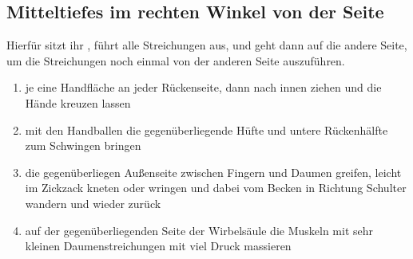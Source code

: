 \iftoggle{long}{
  \pagebreak
}{}
\subsection{Mitteltiefes im rechten Winkel von der Seite}
Hierfür sitzt ihr , führt alle Streichungen aus, und geht dann auf die andere Seite, um die Streichungen noch einmal von der anderen Seite auszuführen.

\begin{oframed}
  \begin{enumerate}
    \item {} je eine Handfläche an jeder Rückenseite, dann nach innen ziehen und die Hände kreuzen lassen
    \iftoggle{long}{
      \item \fett{Rücken öffnen 1:} Legt eure beiden Hände in "`Bet-Haltung"' mit den Handkanten quer zur Wirbelsäule auf die Mitte des Rückens. Geht dann zuerst mit euren Handkanten nach außen, sodass eure Handflächen nach unten zeigen. Zieht sehr langsam mit Kraft nach außen oben bis zum Nacken und unten bis zum Kreuzbein. Haltet diese Position ein paar Sekunden. Achtet darauf, dass ihr keinen Druck direkt auf die Wirbelsäule ausübt.
      \item \fett{Rücken öffnen 2:} Legt eure Unterarme quer zur Wirbelsäule auf die Mitte des Rückens. Die Bewegung ist dann dieselbe wie beim vorherigen Schritt.
    }{}
    \item {} mit den Handballen die gegenüberliegende Hüfte und untere Rückenhälfte zum Schwingen bringen
    \item {} die gegenüberliegen Außenseite zwischen Fingern und Daumen greifen, leicht im Zickzack kneten oder wringen und dabei vom Becken in Richtung Schulter wandern und wieder zurück
    \item {} auf der gegenüberliegenden Seite der Wirbelsäule die Muskeln mit sehr kleinen Daumenstreichungen mit viel Druck massieren
    \iftoggle{long}{
      \item \fett{Endlos-Streichungen auf dem Rückenstrecker mit Fingerknöcheln:} Formt Tigerkrallen mit euren Händen. Streicht dann mit dem zweiten Knöchel der Finger beider Hände den Rückenstrecker der \fett{gegenüberliegenden Rückenhälfte} von der Hüfte bis zum Kopf aus. Stützt bei Bedarf euren Zeigefinger mit dem Daumen.
    }{}
  \end{enumerate}
\end{oframed}



